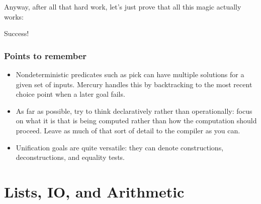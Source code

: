 \documentclass[a4paper,11pt,notitlepage,onecolumn]{book}
\begin{document}
Anyway, after all that hard work, let's just prove that all this magic
actually works:
\begin{small}

\begin{ptabular}
\nextline
{}
\nextline
{}
\nextline
{}
\nextline
{}
\nextline
{}
\nextline
{}
\nextline
{}
\nextline
\end{ptabular}

\end{small}
Success!

\subsection*{Points to remember}

\begin{itemize}
\item Nondeterministic predicates such as \textsf{pick} can have multiple solutions
for a given set of inputs.  Mercury handles this by backtracking to the most
recent choice point when a later goal fails.
\item As far as possible, try to think declaratively rather than
operationally: focus on what it is that is being computed rather than how
the computation should proceed.  Leave as much of that sort of detail to the
compiler as you can.
\item Unification goals are quite versatile: they can denote constructions,
deconstructions, and equality tests.
\end{itemize}
\setcounter{chapter}{1}

\chapter{Lists, IO, and Arithmetic}
\end{document}
